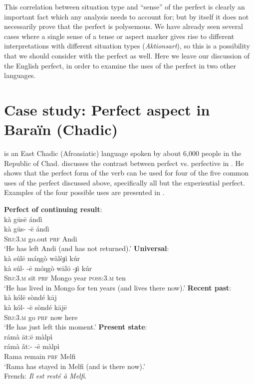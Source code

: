 This correlation between situation type and “sense” of the perfect is clearly an important fact which any analysis needs to account for; but by itself it does not necessarily prove that the perfect is polysemous. We have already seen several cases where a single sense of a tense or aspect marker gives rise to different interpretations with different situation types (\textit{Aktionsart}), so this is a possibility that we should consider with the perfect as well. Here we leave our discussion of the English perfect, in order to examine the uses of the perfect in two other languages.


\section{Case study: Perfect aspect in Baraïn (Chadic)}\label{sec:22.5}

 is an East Chadic (Afroasiatic) language spoken by about 6,000 people in the Republic of Chad. \citet{Lovestrand2012} discusses the contrast between perfect vs. perfective in . He shows that the perfect form of the verb can be used for four of the five common uses of the perfect discussed above, specifically all but the experiential perfect. Examples of the four possible uses are presented in .


\ea \label{ex:22.25}
\ea  \textbf{Perfect of continuing result}:\\
\glll kà  gūsē  {}  ándì\\
kà  gūs-  -ē  ándì\\
\textsc{Sbj:3.m}  go.out  \textsc{prf}  Andi\\
\glt ‘He has left Andi (and has not returned).’
\ex   \textbf{Universal}:\\
\glll kà  súlē  {}  máŋgò  wàlèɟì  {}  kúr\\
kà  súl-  -ē  móŋgò  wālō  -ɟì   kúr\\
\textsc{Sbj:3.m}  sit  \textsc{prf}  Mongo  year  \textsc{poss:3.m}  ten\\
\glt ‘He has lived in Mongo for ten years (and lives there now).’
\ex   \textbf{Recent past}:\\
\glll kà  kólē  {}  sòndé  kāj\\
kà  kól-  -ē  sòndé  kājē\\
\textsc{Sbj:3.m}  go  \textsc{prf}  now  here\\
\glt ‘He has just left this moment.’
\ex   \textbf{Present state}:\\
\glll rámà  ātːē  {}  màlpì\\
rámà  ǎtː-  -ē  màlpì\\
Rama  remain  \textsc{prf}  Melfi\\
\glt ‘Rama has stayed in Melfi (and is there now).’\\
{French}: \textit{Il est resté à Melfi}.
\z \z



